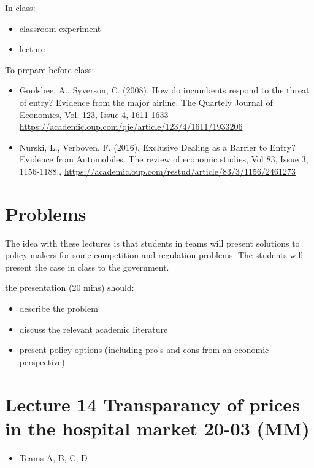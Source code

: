 \documentclass[]{book}
\providecommand{\tightlist}{%
  \setlength{\itemsep}{0pt}\setlength{\parskip}{0pt}}
\begin{document}
In class:

\begin{itemize}
\tightlist
\item
  classroom experiment
\item
  lecture
\end{itemize}

To prepare before class:

\begin{itemize}
\tightlist
\item
  Goolsbee, A., Syverson, C. (2008). How do incumbents respond to the
  threat of entry? Evidence from the major airline. The Quartely Journal
  of Economics, Vol. 123, Issue 4, 1611-1633
  \url{https://academic.oup.com/qje/article/123/4/1611/1933206}
\item
  Nurski, L., Verboven. F. (2016). Exclusive Dealing as a Barrier to
  Entry? Evidence from Automobiles. The review of economic studies, Vol
  83, Issue 3, 1156-1188.,
  \url{https://academic.oup.com/restud/article/83/3/1156/2461273}
\end{itemize}

\section{Problems}\label{problems}

The idea with these lectures is that students in teams will present
solutions to policy makers for some competition and regulation problems.
The students will present the case in class to the government.

the presentation (20 mins) should:

\begin{itemize}
\tightlist
\item
  describe the problem
\item
  discuss the relevant academic literature
\item
  present policy options (including pro's and cons from an economic
  perspective)
\end{itemize}

\section{Lecture 14 Transparancy of prices in the hospital market 20-03
(MM)}\label{lecture-14-transparancy-of-prices-in-the-hospital-market-20-03-mm}

\begin{itemize}
\tightlist
\item
  Teams A, B, C, D
\end{itemize}
\end{document}
